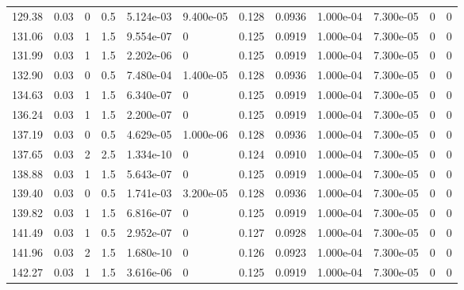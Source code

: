 \documentclass[preview]{standalone}
\begin{document}
{{{{\begin{tabular}{L{1.2cm}C{1.2cm} C{0.3cm}C{0.5cm} C{1.4cm}C{1.4cm} C{1.4cm}C{1.4cm} C{1.6cm}C{1.6cm} C{1.6cm}C{1.6cm}}
  129.38  &  0.03  & 0     & 0.5 &  5.124e-03  & 9.400e-05  &  0.128&   0.0936& 1.000e-04 & 7.300e-05   &  0 & 0  \\ 
  131.06  &  0.03  & 1     & 1.5 &  9.554e-07  & 0  &  0.125&   0.0919& 1.000e-04 & 7.300e-05   &  0 & 0  \\ 
  131.99  &  0.03  & 1     & 1.5 &  2.202e-06  & 0  &  0.125&   0.0919& 1.000e-04 & 7.300e-05   &  0 & 0  \\ 
  132.90  &  0.03  & 0     & 0.5 &  7.480e-04  & 1.400e-05  &  0.128&   0.0936& 1.000e-04 & 7.300e-05   &  0 & 0  \\ 
  134.63  &  0.03  & 1     & 1.5 &  6.340e-07  & 0  &  0.125&   0.0919& 1.000e-04 & 7.300e-05   &  0 & 0  \\ 
  136.24  &  0.03  & 1     & 1.5 &  2.200e-07  & 0  &  0.125&   0.0919& 1.000e-04 & 7.300e-05   &  0 & 0  \\ 
  137.19  &  0.03  & 0     & 0.5 &  4.629e-05  & 1.000e-06  &  0.128&   0.0936& 1.000e-04 & 7.300e-05   &  0 & 0  \\ 
  137.65  &  0.03  & 2     & 2.5 &  1.334e-10  & 0  &  0.124&   0.0910& 1.000e-04 & 7.300e-05   &  0 & 0  \\ 
  138.88  &  0.03  & 1     & 1.5 &  5.643e-07  & 0  &  0.125&   0.0919& 1.000e-04 & 7.300e-05   &  0 & 0  \\ 
  139.40  &  0.03  & 0     & 0.5 &  1.741e-03  & 3.200e-05  &  0.128&   0.0936& 1.000e-04 & 7.300e-05   &  0 & 0  \\ 
  139.82  &  0.03  & 1     & 1.5 &  6.816e-07  & 0  &  0.125&   0.0919& 1.000e-04 & 7.300e-05   &  0 & 0  \\ 
  141.49  &  0.03  & 1     & 0.5 &  2.952e-07  & 0  &  0.127&   0.0928& 1.000e-04 & 7.300e-05   &  0 & 0  \\ 
  141.96  &  0.03  & 2     & 1.5 &  1.680e-10  & 0  &  0.126&   0.0923& 1.000e-04 & 7.300e-05   &  0 & 0  \\ 
  142.27  &  0.03  & 1     & 1.5 &  3.616e-06  & 0  &  0.125&   0.0919& 1.000e-04 & 7.300e-05   &  0 & 0  \\ 
\hline 
\end{tabular} 

}}}}
\end{document}
